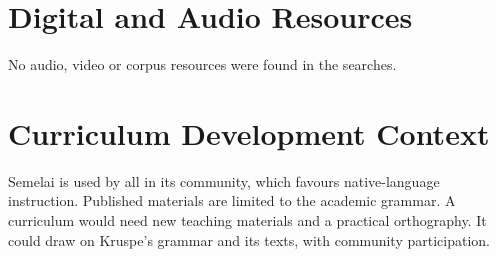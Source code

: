 \documentclass[12pt]{article}
\begin{document}
\section{Digital and Audio Resources}
No audio, video or corpus resources were found in the searches.

\section{Curriculum Development Context}
Semelai is used by all in its community, which favours native-language instruction. Published materials are limited to the academic grammar. A curriculum would need new teaching materials and a practical orthography. It could draw on Kruspe's grammar and its texts, with community participation.
\end{document}
